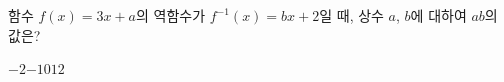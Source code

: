 \hspace*{2mm}\begin{minipage}[t]{\dimexpr\linewidth-2mm\relax}\vspace{0pt}
함수 $f(x)=3x+a$의 역함수가 $f^{-1}(x)=bx+2$일 때, 상수 $a$, $b$에 대하여 $ab$의 값은?
\begin{choices32}{$-2$}{$-1$}{$0$}{$1$}{$2$}\end{choices32}\end{minipage}
